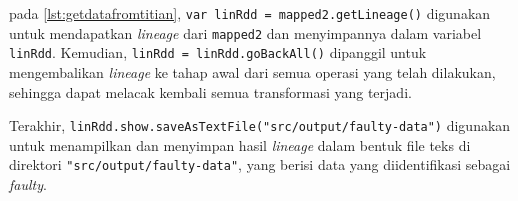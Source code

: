 \begin{enumerate}[topsep=0pt, itemsep=0pt]
\begin{itemize}
      

      pada \ref{lst:getdatafromtitian}, \texttt{var linRdd = mapped2.getLineage()} digunakan untuk mendapatkan \emph{lineage} dari \texttt{mapped2} dan menyimpannya dalam variabel \texttt{linRdd}. Kemudian, \texttt{linRdd = linRdd.goBackAll()} dipanggil untuk mengembalikan \emph{lineage} ke tahap awal dari semua operasi yang telah dilakukan, sehingga dapat melacak kembali semua transformasi yang terjadi. 
      
      Terakhir, \texttt{linRdd.show.saveAsTextFile("src/output/faulty-data")} digunakan untuk menampilkan dan menyimpan hasil \emph{lineage} dalam bentuk file teks di direktori \texttt{"src/output/faulty-data"}, yang berisi data yang diidentifikasi sebagai \emph{faulty}.
   

  \end{itemize}
\end{enumerate}

